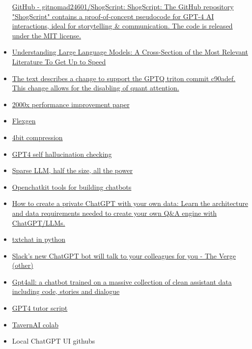 \begin{itemize}
  \href{https://github.com/gitnomad24601/ShogScript}{GitHub -
  gitnomad24601/ShogScript: ShogScript: The GitHub repository
  "ShogScript" contains a proof-of-concept pseudocode for GPT-4 AI
  interactions, ideal for storytelling \& communication. The code is
  released under the MIT license.}
\item
  \href{https://magazine.sebastianraschka.com/p/understanding-large-language-models}{Understanding
  Large Language Models: A Cross-Section of the Most Relevant Literature
  To Get Up to Speed}
\item
  \href{https://github.com/oobabooga/text-generation-webui/pull/1229}{The
  text describes a change to support the GPTQ triton commit c90adef.
  This change allows for the disabling of quant attention.}
\item
  \href{https://arxiv.org/abs/2305.02301}{2000x performance improvement
  paper}
\item
  \href{https://github.com/FMInference/FlexGen\#get-started-with-a-single-gpu}{Flexgen}
\item
  \href{https://github.com/johnsmith0031/alpaca_lora_4bit}{4bit
  compression}
\item
  \href{https://www.reddit.com/r/MachineLearning/comments/123b66w/dgpt4_might_be_able_to_tell_you_if_it_hallucinated/}{GPT4
  self hallucination checking}
\item
  \href{https://arxiv.org/abs/2301.00774}{Sparse LLM, half the size, all
  the power}
\item
  \href{https://github.com/togethercomputer/OpenChatKit}{Openchatkit
  tools for building chatbots}
\item
  \href{https://medium.com/@imicknl/how-to-create-a-private-chatgpt-with-your-own-data-15754e6378a1}{How
  to create a private ChatGPT with your own data: Learn the architecture
  and data requirements needed to create your own Q\&A engine with
  ChatGPT/LLMs.}
\item
  \href{https://github.com/neuml/txtchat}{txtchat in python}
\item
  \href{https://www.theverge.com/2023/3/7/23628673/chatgpt-slack-salesforce-einstein-ai-business-messaging}{Slack's
  new ChatGPT bot will talk to your colleagues for you - The Verge
  (other)}
\item
  \href{https://github.com/nomic-ai/gpt4all}{Gpt4all: a chatbot trained
  on a massive collection of clean assistant data including code,
  stories and dialogue}
\item
  \href{https://github.com/JushBJJ/Mr.-Ranedeer-AI-Tutor}{GPT4 tutor
  script}
\item
  \href{https://colab.research.google.com/github/TavernAI/TavernAI/blob/main/colab/GPU.ipynb}{TavernAI
  colab}
\item
  Local ChatGPT UI githubs


\end{itemize}
